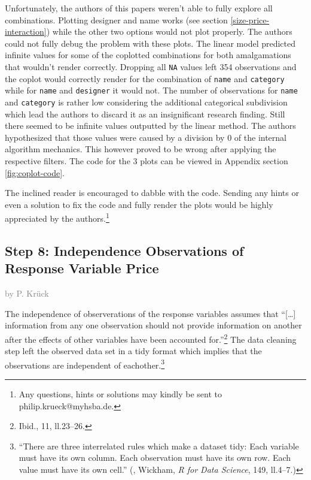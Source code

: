 \documentclass[a4paper, nobind]{templates/ociamthesis}
\begin{document}
Unfortunately, the authors of this papers weren't able to fully explore all combinations.
Plotting designer and name works (see section \ref{size-price-interaction}) while the other two options would not plot properly.
The authors could not fully debug the problem with these plots.
The linear model predicted infinite values for some of the coplotted combinations for both amalgamations that wouldn't render correctly.
Dropping all \texttt{NA} values left 354 observations and the coplot would correctly render for the combination of \texttt{name} and \texttt{category} while for \texttt{name} and \texttt{designer} it would not. The number of observations for \texttt{name} and \texttt{category} is rather low considering the additional categorical subdivision which lead the authors to discard it as an insignificant research finding.
Still there seemed to be infinite values outputted by the linear method. The authors hypothesized that those values were caused by a division by 0 of the internal algorithm mechanics. This however proved to be wrong after applying the respective filters.
The code for the 3 plots can be viewed in Appendix section \ref{fig:coplot-code}.

The inclined reader is encouraged to dabble with the code. Sending any hints or even a solution to fix the code and fully render the plots would be highly appreciated by the authors.\footnote{Any questions, hints or solutions may kindly be sent to philip.krueck@myhsba.de.}

\hypertarget{step-8-independence-observations-of-response-variable-price}{%
\subsection{Step 8: Independence Observations of Response Variable Price}\label{step-8-independence-observations-of-response-variable-price}}

\textcolor{gray}{by P. Krück}

The independence of observerations of the response variables assumes that ``{[}\ldots{}{]} information from any one observation should not provide information on another after the effects of other variables have been accounted for.''\footnote{Ibid., 11, ll.23--26.}
The data cleaning step left the observed data set in a tidy format which implies that the observations are independent of eachother.\footnote{``There are three interrelated rules which make a dataset tidy: Each variable must have its own column. Each observation must have its own row. Each value must have its own cell.'' (, Wickham, \emph{R for Data Science}, 149, ll.4--7.)}
\end{document}
